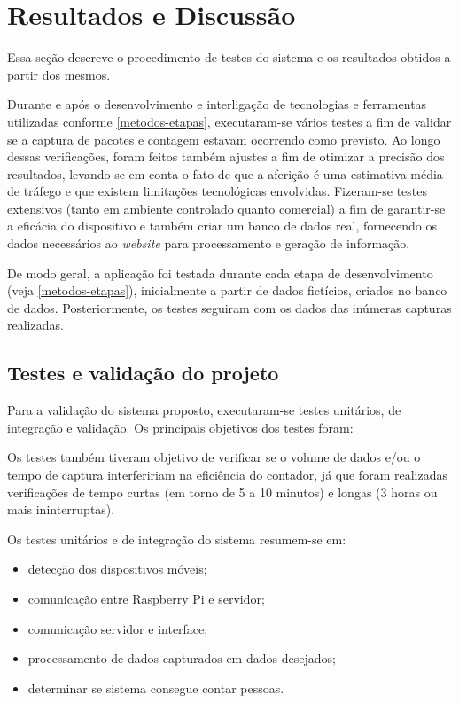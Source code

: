 \chapter{Resultados e Discussão}
\label{resultados-discussao}

Essa seção descreve o procedimento de testes do sistema e os resultados obtidos a partir dos mesmos.

Durante e após o desenvolvimento e interligação de tecnologias e ferramentas utilizadas conforme \autoref{metodos-etapas}, executaram-se vários testes a fim de validar se a captura de pacotes e contagem estavam ocorrendo como previsto. Ao longo dessas verificações, foram feitos também ajustes a fim de otimizar a precisão dos resultados, levando-se em conta o fato de que a aferição é uma estimativa média de tráfego e que existem limitações tecnológicas envolvidas. Fizeram-se testes extensivos (tanto em ambiente controlado quanto comercial) a fim de garantir-se a eficácia do dispositivo e também criar um banco de dados real, fornecendo os dados necessários ao \emph{website} para processamento e geração de informação.

De modo geral, a aplicação foi testada durante cada etapa de desenvolvimento (veja \autoref{metodos-etapas}), inicialmente a partir de dados fictícios, criados no banco de dados. Posteriormente, os testes seguiram com os dados das inúmeras capturas realizadas.


\section{Testes e validação do projeto}

Para a validação do sistema proposto, executaram-se testes unitários, de integração e
validação. Os principais objetivos dos testes foram:


Os testes também tiveram objetivo de verificar se o volume de dados e/ou o tempo de captura interfeririam na eficiência do contador, já que foram realizadas verificações de tempo curtas (em torno de 5 a 10 minutos) e longas (3 horas ou mais ininterruptas).

Os testes unitários e de integração do sistema resumem-se em:

\begin{itemize}
  \item detecção dos dispositivos móveis;
  \item comunicação entre Raspberry Pi e servidor;
  \item comunicação servidor e interface;
  \item processamento de dados capturados em dados desejados;
  \item determinar se sistema consegue contar pessoas.
\end{itemize}

